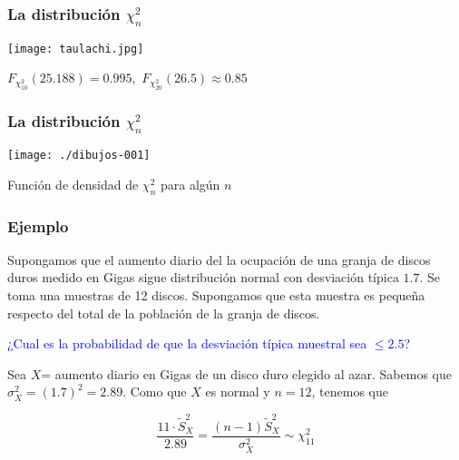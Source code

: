 \documentclass[12pt,t]{beamer}\usepackage[]{graphicx}\usepackage[]{color}
\newcommand{\blue}[1]{\textcolor{blue}{#1}}
\renewcommand{\leq}{\leqslant}
\theoremstyle{plain}
\theoremstyle{definition}
\begin{document}
\begin{frame}
\frametitle{La distribución $\chi_n^2$}
\vspace*{-1cm}

\begin{center}
\texttt{[image: taulachi.jpg]}
\end{center}

$F_{\chi_{10}^2}(25.188)=0.995$,\  $F_{\chi_{20}^2}(26.5)\approx 0.85$

\end{frame}


\begin{frame}
\frametitle{La distribución $\chi_n^2$}
\vspace*{-1cm}

\begin{center}
\texttt{[image: ./dibujos-001]}

Función  de densidad de $\chi^2_n$ para  algún  $n$
\end{center}
\end{frame}

\begin{frame}
\frametitle{Ejemplo}
\vspace*{-2ex}

Supongamos que  el  aumento  diario del la ocupación de una granja de  discos duros medido  en Gigas sigue distribución normal con desviación típica $1.7$. Se toma una muestras de 12 discos. Supongamos que esta  muestra es pequeña respecto del total de la población de la granja de discos.
\medskip

\blue{¿Cual es  la probabilidad de que la desviación típica muestral
sea $\leq 2.5$?}
\medskip

Sea $X$= aumento diario en Gigas de un disco duro elegido al azar. 
Sabemos que $\sigma_{X}^2=(1.7)^2=2.89$. Como que $X$ es normal
 y $n=12$, tenemos que
 
$$
\frac{11\cdot \widetilde{S}_{X}^2}{2.89}=\frac{(n-1)\widetilde{S}_{X}^2}{\sigma_{X}^2}\sim \chi^2_{11}
$$

        
\end{frame}
\end{document}
